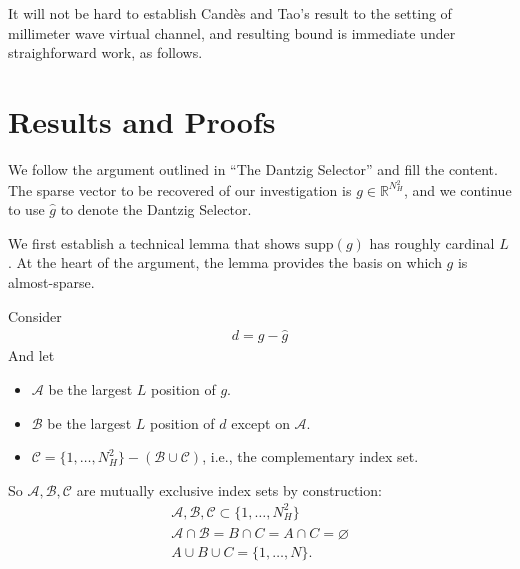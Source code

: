 \documentclass[12pt]{article}
\begin{document}
It will not be hard to establish Cand\`es and Tao's result to the setting of millimeter wave virtual channel, and resulting bound is immediate under straighforward work, as follows.

\section{Results and Proofs}

We follow the argument outlined in ``The Dantzig Selector'' and fill the content.
The sparse vector to be recovered of our investigation is \(g \in \mathbb{R}^{N_H^2}\), and we continue to use \(\hat{g}\) to denote the Dantzig Selector.

We first establish a technical lemma that shows \(\mathrm{supp}(g)\) has roughly cardinal \(L\).
At the heart of the argument, the lemma provides the basis on which \(g\) is almost-sparse.

Consider
\begin{gather}
d =g -\hat{g}
\end{gather}
And let
\begin{itemize}
\item \(\mathcal{A}\) be the largest \(L\) position of \(g\).
\item \(\mathcal{B}\) be the largest \(L\) position of \(d\) except on \(\mathcal{A}\).
\item \(\mathcal{C} =\{1, \dotsc, N_H^2\} -( \mathcal{B} \cup \mathcal{C} )\), i.e., the complementary index set.
\end{itemize}
So \(\mathcal{A}, \mathcal{B}, \mathcal{C}\) are mutually exclusive index sets by construction:
\begin{gather}
\mathcal{A}, \mathcal{B}, \mathcal{C} \subset \{1, \dotsc, N_H^2\} \\
\mathcal{A} \cap \mathcal{B} =B \cap C =A \cap C =\varnothing \\
A \cup B \cup C =\{1, \dotsc, N\}.
\end{gather}
\end{document}
